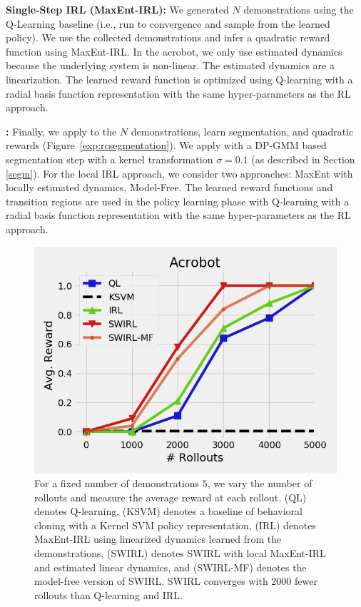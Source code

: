 \vspace{0.25em}\noindent \textbf{Single-Step IRL (MaxEnt-IRL): } We generated $N$ demonstrations using the Q-Learning baseline (i.e., run to convergence and sample from the learned policy). We use the collected demonstrations and infer a quadratic reward function using MaxEnt-IRL. In the acrobot, we only use estimated dynamics because the underlying system is non-linear. The estimated dynamics are a linearization. The learned reward function is optimized using Q-learning with a radial basis function representation with the same hyper-parameters as the RL approach. 

\vspace{0.25em}\noindent \textbf{\hirl: } Finally, we apply \hirl to the $N$ demonstrations, learn segmentation, and quadratic rewards (Figure~\ref{exp:rcsegmentation}).
We apply \hirl with a DP-GMM based segmentation step with a kernel transformation $\sigma = 0.1$ (as described in Section \ref{segm}).
For the local IRL approach, we consider two approaches: MaxEnt with locally estimated dynamics, Model-Free. 
The learned reward functions and transition regions are used in the policy learning phase with Q-learning with a radial basis function representation with the same hyper-parameters as the RL approach.


\begin{figure}[t]
\centering
 \includegraphics[width=0.8\columnwidth]{new-exp/acr.png}
 \caption{For a fixed number of demonstrations $5$, we vary the number of rollouts and measure the average reward at each rollout. (QL) denotes Q-learning, (KSVM) denotes a baseline of behavioral cloning with a Kernel SVM policy representation, (IRL) denotes MaxEnt-IRL using linearized dynamics learned from the demonstrations, (SWIRL) denotes SWIRL with local MaxEnt-IRL and estimated linear dynamics, and (SWIRL-MF) denotes the model-free version of SWIRL. SWIRL converges with 2000 fewer rollouts than Q-learning and IRL. \label{exp:acr}}
\end{figure}


